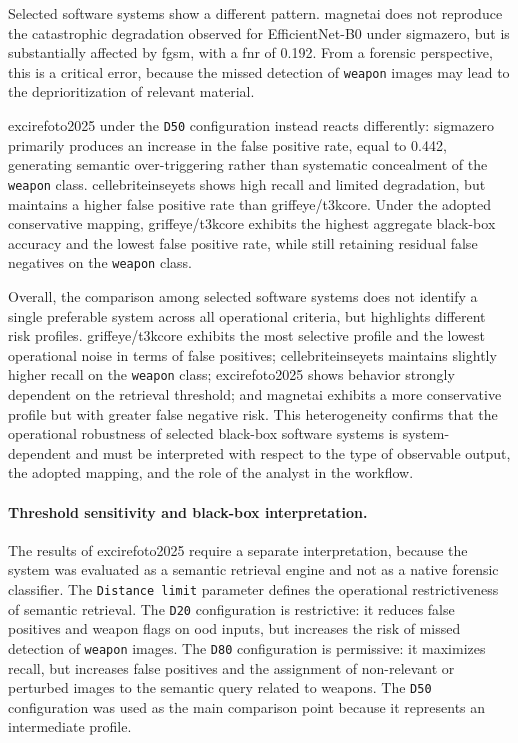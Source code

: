 Selected software systems show a different pattern. \gls{magnetai} does not
reproduce the catastrophic degradation observed for EfficientNet-B0 under
\gls{sigmazero}, but is substantially affected by \gls{fgsm}, with a
\gls{fnr} of 0.192. From a forensic perspective, this is a critical error,
because the missed detection of \texttt{weapon} images may lead to the
deprioritization of relevant material.

\gls{excirefoto2025} under the \texttt{D50} configuration instead reacts
differently: \gls{sigmazero} primarily produces an increase in the false
positive rate, equal to 0.442, generating semantic over-triggering rather than
systematic concealment of the \texttt{weapon} class. \gls{cellebriteinseyets}
shows high recall and limited degradation, but maintains a higher false
positive rate than \gls{griffeye}/\gls{t3kcore}. Under the adopted conservative
mapping, \gls{griffeye}/\gls{t3kcore} exhibits the highest aggregate black-box
accuracy and the lowest false positive rate, while still retaining residual
false negatives on the \texttt{weapon} class.

Overall, the comparison among selected software systems does not identify a
single preferable system across all operational criteria, but highlights
different risk profiles. \gls{griffeye}/\gls{t3kcore} exhibits the most
selective profile and the lowest operational noise in terms of false positives;
\gls{cellebriteinseyets} maintains slightly higher recall on the
\texttt{weapon} class; \gls{excirefoto2025} shows behavior strongly dependent
on the retrieval threshold; and \gls{magnetai} exhibits a more conservative
profile but with greater false negative risk. This heterogeneity confirms that
the operational robustness of selected black-box software systems is
system-dependent and must be interpreted with respect to the type of observable
output, the adopted mapping, and the role of the analyst in the workflow.

\paragraph{Threshold sensitivity and black-box interpretation.}

The results of \gls{excirefoto2025} require a separate interpretation, because
the system was evaluated as a semantic retrieval engine and not as a native
forensic classifier. The \texttt{Distance limit} parameter defines the
operational restrictiveness of semantic retrieval. The \texttt{D20}
configuration is restrictive: it reduces false positives and weapon flags on
\gls{ood} inputs, but increases the risk of missed detection of
\texttt{weapon} images. The \texttt{D80} configuration is permissive: it
maximizes recall, but increases false positives and the assignment of
non-relevant or perturbed images to the semantic query related to weapons. The
\texttt{D50} configuration was used as the main comparison point because it
represents an intermediate profile.

